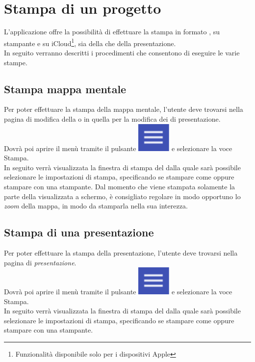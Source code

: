 \section{Stampa di un progetto} \label{stamp}
L'applicazione \Premi offre la possibilità di effettuare la stampa in formato , su stampante e su iCloud\footnote{Funzionalità disponibile solo per i dispositivi Apple}, sia della  che della presentazione.\\
In seguito verranno descritti i procedimenti che consentono di eseguire le varie stampe.
\subsection{Stampa mappa mentale}
Per poter effettuare la stampa della mappa mentale, l'utente deve trovarsi nella pagina di modifica della  o in quella per la modifica dei  di presentazione.\\
Dovrà poi aprire il menù tramite il pulsante \includegraphics[scale=0.5]{immagini/buttonMenu.pdf} e selezionare la voce Stampa.\\
In seguito verrà visualizzata la finestra di stampa del  dalla quale sarà possibile selezionare le impostazioni di stampa, specificando se stampare come  oppure stampare con una stampante.
Dal momento che viene stampata solamente la parte della  visualizzata a schermo, è consigliato regolare in modo opportuno lo \textit{zoom} della mappa, in modo da stamparla nella sua interezza.
\subsection{Stampa di una presentazione}\label{stampaPresentazione}
Per poter effettuare la stampa della presentazione, l'utente deve trovarsi nella pagina di \textit{presentazione}.\\
Dovrà poi aprire il menù tramite il pulsante \includegraphics[scale=0.5]{immagini/buttonMenu.pdf} e selezionare la voce Stampa.\\
In seguito verrà visualizzata la finestra di stampa del  dalla quale sarà possibile selezionare le impostazioni di stampa, specificando se stampare come  oppure stampare con una stampante.
